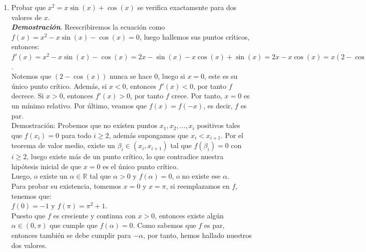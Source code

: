 \documentclass{report}
\begin{document}
\begin{enumerate}
        \item Probar que $x^2=x\sin(x)+\cos(x)$ se verifica exactamente para dos valores de $x$.\\
        \textit{\textbf{Demostración}}. Reescribiremos la ecuación como $f(x)=x^2-x\sin(x)-\cos(x)=0$, luego hallemos sus puntos críticos, entonces:\\
        $f'(x)=x^2-x\sin(x)-\cos(x)= 2x-\sin(x)-x\cos(x)+\sin(x)=2x-x\cos(x)=x(2-\cos(x))$.\\
        Notemos que $(2-\cos(x))$ nunca se hace $0$, luego si $x=0$, este es su único punto crítico.
        Además, si $x<0$, entonces $f'(x)<0$, por tanto $f$ decrece. Si $x>0$, entonces $f'(x)>0$, por tanto $f$ crece. Por tanto, $x=0$ es un mínimo relativo.
        Por último, veamos que $f(x)=f(-x)$, es decir, $f$ es par.\\
        Demostración: Probemos que no existen puntos $x_1,x_2,...,x_i$ positivos tales que $f(x_i)=0$ para todo $i\geq 2$, además supongamos que $x_i< x_{i+1}$.
        Por el teorema de valor medio, existe un $\beta_i \in (x_i,x_{i+1})$ tal que $f(\beta_i)=0$ con $i\geq2$, luego existe más de un punto crítico, lo que contradice nuestra hipótesis inicial de que $x=0$ es el único punto crítico.\\
        Luego, o existe un $\alpha\in \mathbb{R}$ tal que  $\alpha>0$ y $f(\alpha)=0$, o no existe ese $\alpha$.\\
        Para probar su existencia, tomemos $x=0$ y $x= \pi$, si reemplazamos en $f$, tenemos que:\\
        $f(0)=-1$ y $f(\pi)=\pi^2+1$.\\
        Puesto que $f$ es creciente y continua con $x>0$, entonces existe algún $\alpha \in (0,\pi)$ que cumple que $f(\alpha)=0$. Como sabemos que $f$ es par, entonces también se debe cumplir para $-\alpha$, por tanto, hemos hallado nuestros dos valores.


\end{enumerate}
\end{document}
